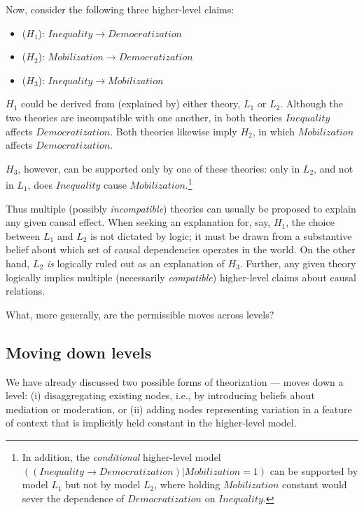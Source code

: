 \documentclass[12pt,]{book}
\providecommand{\tightlist}{%
  \setlength{\itemsep}{0pt}\setlength{\parskip}{0pt}}
\let\rmarkdownfootnote\footnote%
\def\footnote{\protect\rmarkdownfootnote}
\begin{document}
Now, consider the following three higher-level claims:

\begin{itemize}
\tightlist
\item
  (\(H_1\)): \(Inequality \rightarrow Democratization\)
\item
  (\(H_2\)): \(Mobilization \rightarrow Democratization\)
\item
  (\(H_3\)): \(Inequality \rightarrow Mobilization\)
\end{itemize}

\(H_1\) could be derived from (explained by) either theory, \(L_1\) or \(L_2\). Although the two theories are incompatible with one another, in both theories \(Inequality\) affects \(Democratization\). Both theories likewise imply \(H_2\), in which \(Mobilization\) affects \(Democratization\).

\(H_3\), however, can be supported only by one of these theories: only in \(L_2\), and not in \(L_1\), does \(Inequality\) cause \(Mobilization\).\footnote{In addition, the \emph{conditional} higher-level model \(((Inequality \rightarrow Democratization)|Mobilization=1)\) can be supported by model \(L_1\) but not by model \(L_2\), where holding \(Mobilization\) constant would sever the dependence of \(Democratization\) on \(Inequality\).}

Thus multiple (possibly \emph{incompatible}) theories can usually be proposed to explain any given causal effect. When seeking an explanation for, say, \(H_1\), the choice between \(L_1\) and \(L_2\) is not dictated by logic; it must be drawn from a substantive belief about which set of causal dependencies operates in the world. On the other hand, \(L_2\) \emph{is} logically ruled out as an explanation of \(H_3\). Further, any given theory logically implies multiple (necessarily \emph{compatible}) higher-level claims about causal relations.

What, more generally, are the permissible moves across levels?

\hypertarget{moving-down-levels}{%
\subsection{Moving down levels}\label{moving-down-levels}}

We have already discussed two possible forms of theorization --- moves down a level: (i) disaggregating existing nodes, i.e., by introducing beliefs about mediation or moderation, or (ii) adding nodes representing variation in a feature of context that is implicitly held constant in the higher-level model.
\end{document}
